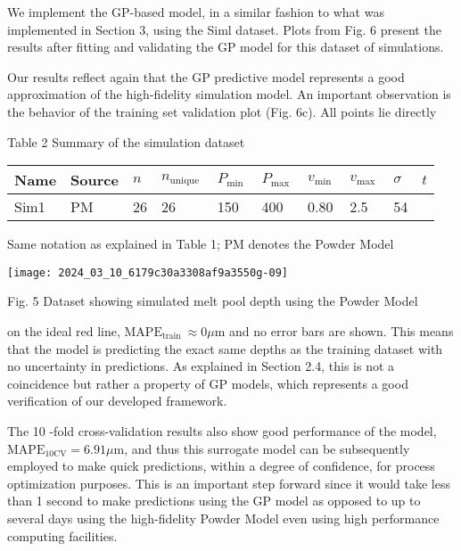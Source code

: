 \documentclass[10pt]{article}
\begin{document}
We implement the GP-based model, in a similar fashion to what was implemented in Section 3, using the Siml dataset. Plots from Fig. 6 present the results after fitting and validating the GP model for this dataset of simulations.

Our results reflect again that the GP predictive model represents a good approximation of the high-fidelity simulation model. An important observation is the behavior of the training set validation plot (Fig. 6c). All points lie directly

Table 2 Summary of the simulation dataset

\begin{center}
\begin{tabular}{llllllllll}
\hline
Name & Source & $n$ & $n_{\text {unique }}$ & $P_{\text {min }}$ & $P_{\text {max }}$ & $v_{\text {min }}$ & $v_{\text {max }}$ & $\sigma$ & $t$ \\
\hline
Sim1 & PM & 26 & 26 & 150 & 400 & 0.80 & 2.5 & 54 &  \\
\hline
\end{tabular}
\end{center}

Same notation as explained in Table 1; PM denotes the Powder Model

\begin{center}
\texttt{[image: 2024\_03\_10\_6179c30a3308af9a3550g-09]}
\end{center}

Fig. 5 Dataset showing simulated melt pool depth using the Powder Model

on the ideal red line, $\mathrm{MAPE}_{\text {train }} \approx 0 \mu \mathrm{m}$ and no error bars are shown. This means that the model is predicting the exact same depths as the training dataset with no uncertainty in predictions. As explained in Section 2.4, this is not a coincidence but rather a property of GP models, which represents a good verification of our developed framework.

The 10 -fold cross-validation results also show good performance of the model, $\mathrm{MAPE}_{10 \mathrm{CV}}=6.91 \mu \mathrm{m}$, and thus this surrogate model can be subsequently employed to make quick predictions, within a degree of confidence, for process optimization purposes. This is an important step forward since it would take less than 1 second to make predictions using the GP model as opposed to up to several days using the high-fidelity Powder Model even using high performance computing facilities.
\end{document}
